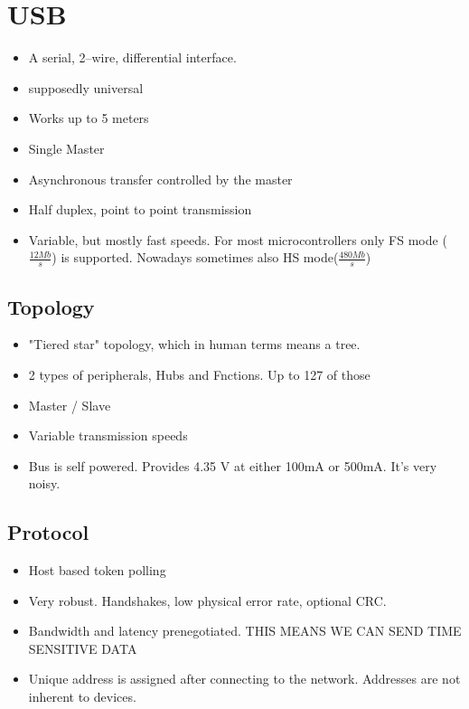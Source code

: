 \section{USB}
\begin{itemize}
        \item A serial, 2--wire, differential interface.
        \item supposedly universal
        \item Works up to 5 meters
        \item Single Master
        \item Asynchronous transfer controlled by the master
        \item Half duplex, point to point transmission
        \item Variable, but mostly fast speeds. For most microcontrollers only FS mode ($\frac{12Mb}{s}$) is supported. Nowadays sometimes also HS mode($\frac{480Mb}{s}$)
\end{itemize}

\subsection{Topology}
\begin{itemize}
        \item "Tiered star" topology, which in human terms means a tree.
        \item 2 types of peripherals, Hubs and Fnctions. Up to 127 of those
        \item  Master / Slave
        \item Variable transmission speeds
        \item Bus is self powered. Provides 4.35 V at either 100mA or 500mA. It's very noisy.

\end{itemize}

\subsection{Protocol}
\begin{itemize}
        \item Host based token polling
        \item Very robust. Handshakes, low physical error rate, optional CRC.
        \item Bandwidth and latency prenegotiated. THIS MEANS WE CAN SEND TIME SENSITIVE DATA
        \item Unique address is assigned after connecting to the network. Addresses are not inherent to devices.
\end{itemize}
